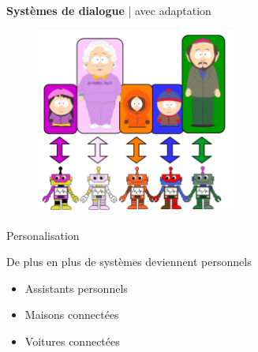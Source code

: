 \documentclass[french,handout]{beamer}
\begin{document}
    \begin{frame}{\textbf{Systèmes de dialogue} | avec adaptation}
        \begin{figure}
            \begin{center}
                \includegraphics[width=0.6\textwidth]{img/adap1.pdf}
            \end{center}
        \end{figure}
    \end{frame}

    \begin{frame}{Personalisation}

        De plus en plus de systèmes deviennent personnels

        \begin{itemize}
            \item Assistants personnels %
            \item Maisons connectées %
            \item Voitures connectées
        \end{itemize}

    \end{frame}
\end{document}
